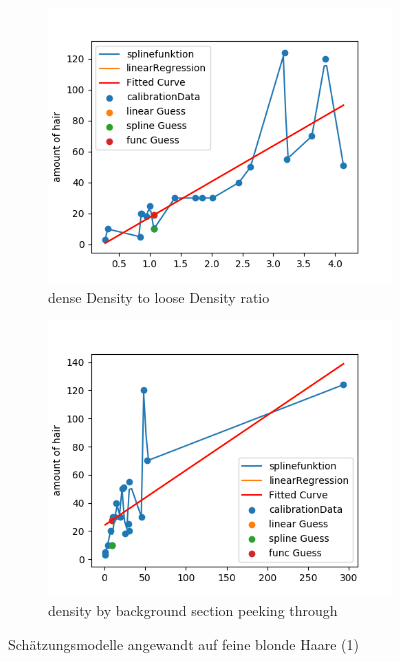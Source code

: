 \documentclass[german,a4paper, 12pt]{llncs}
\begin{document}
\begin{figure}[H]
	\medskip
	\begin{subfigure}{0.48\textwidth}
		\includegraphics[width=1.1\linewidth]{figBina/g5.png}
		\caption{dense Density to loose Density ratio} \label{fig:e}
	\end{subfigure}\hspace*{\fill}
	\begin{subfigure}{0.48\textwidth}
		\includegraphics[width=1.1\linewidth]{figBina/g6.png}
		\caption{density by background section peeking through} \label{fig:f}
	\end{subfigure}
	
	
	\caption{Schätzungsmodelle angewandt auf feine blonde Haare (1)} \label{fig:1}
\end{figure}
\end{document}
